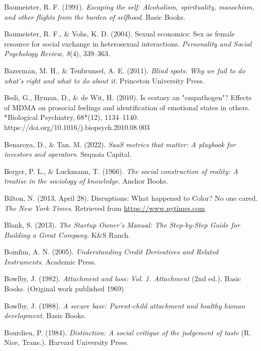 \begin{thebibliography}{}
    Baumeister, R. F. (1991). \textit{Escaping the self: Alcoholism, spirituality, masochism, and other flights from the burden of selfhood}. Basic Books.
    
    Baumeister, R. F., \& Vohs, K. D. (2004). Sexual economics: Sex as female resource for social exchange in heterosexual interactions. \textit{Personality and Social Psychology Review, 8}(4), 339–363.
    
    Bazerman, M. H., \& Tenbrunsel, A. E. (2011). \textit{Blind spots: Why we fail to do what's right and what to do about it}. Princeton University Press.

    Bedi, G., Hyman, D., \& de Wit, H. (2010). Is ecstasy an "empathogen"? Effects of MDMA on prosocial feelings and identification of emotional states in others. *Biological Psychiatry, 68*(12), 1134–1140. https://doi.org/10.1016/j.biopsych.2010.08.003

    Benaroya, D., \& Tan, M. (2022). \textit{SaaS metrics that matter: A playbook for investors and operators}. Sequoia Capital.
    
    Berger, P. L., \& Luckmann, T. (1966). \textit{The social construction of reality: A treatise in the sociology of knowledge}. Anchor Books.

    Bilton, N. (2013, April 28). Disruptions: What happened to Color? No one cared. \textit{The New York Times}. Retrieved from \url{https://www.nytimes.com}

    Blank, S. (2013). \textit{The Startup Owner's Manual: The Step-by-Step Guide for Building a Great Company}. K\&S Ranch.

    Bomfim, A. N. (2005). \textit{Understanding Credit Derivatives and Related Instruments}. Academic Press.

    Bowlby, J. (1982). \textit{Attachment and loss: Vol. 1. Attachment} (2nd ed.). Basic Books. (Original work published 1969)

    Bowlby, J. (1988). \textit{A secure base: Parent-child attachment and healthy human development}. Basic Books.
    
    Bourdieu, P. (1984). \textit{Distinction: A social critique of the judgement of taste} (R. Nice, Trans.). Harvard University Press.


\end{thebibliography}
